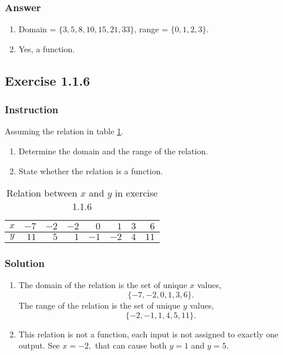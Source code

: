 \documentclass[11pt, letterpaper, oneside]{memoir}
\begin{document}
\subsubsection{Answer}

\begin{enumerate}[label=(\alph*)]
  \item Domain = $  \{ 3, 5, 8, 10, 15, 21, 33 \} $, range = $ \{ 0, 1, 2, 3\} $.
  \item Yes, a function.
\end{enumerate}

\subsection*{Exercise 1.1.6}

\subsubsection{Instruction}

Assuming the relation in table \ref{table:exercise-1.1.6}.
\begin{enumerate}[label=(\alph*)]
  \item Determine the domain and the range of the relation.
  \item State whether the relation is a function.
\end{enumerate}

\begin{table}[ht]
  \centering
  \begin{tabular}{ c | r r r r r r r }
    \hline
    $ x $ & $ -7 $ & $ -2 $ & $ -2 $ & $ 0 $ & $ 1 $ & $ 3 $ & $ 6 $ \\
    \hline
    $ y $ & $ 11 $ & $ 5 $ & $ 1 $ & $ -1 $ & $ -2 $ & $ 4 $ & $ 11 $ \\
    \hline
  \end{tabular}
  \caption{Relation between $ x $ and $ y $ in exercise 1.1.6}
  \label{table:exercise-1.1.6}
\end{table}

\subsubsection{Solution}

\begin{enumerate}[label=(\alph*)]
  \item The domain of the relation is the set of unique $ x $ values,
    $$ \phantom{.}
    \{ -7, -2, 0, 1, 3, 6 \}
    .$$
    The range of the relation is the set of unique $ y $ values,
    $$ \phantom{.}
    \{ -2, -1, 1, 4, 5, 11\}
    .$$
  \item This relation is not a function, each input is not assigned to exactly one output. See $ x = -2, $ that can cause both $ y = 1 $ and $ y = 5 $.
\end{enumerate}
\end{document}
